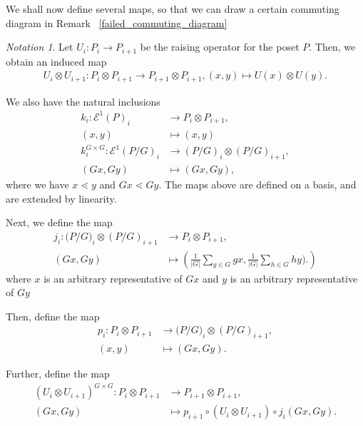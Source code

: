 \documentclass[10 pt]{amsart}
\theoremstyle{plain}
\theoremstyle{definition}
\theoremstyle{remark}
\newtheorem{note}[thm]{Notation}
\numberwithin{equation}{section}
\begin{document}
We shall now define several maps, so that we can draw a certain commuting diagram in Remark ~\ref{failed_commuting_diagram}


\begin{note}
Let $U_i:P_i \rightarrow P_{i+1}$ be the raising operator for the poset $P.$ Then, we obtain an induced map
\begin{align*}
	U_i \otimes U_{i+1}:P_i\otimes P_{i+1} \rightarrow P_{i+1} \otimes P_{i+1},(x,y) \mapsto U(x) \otimes U(y).
\end{align*}

We also have the natural inclusions
\begin{align*}
	k_i:\mathcal E^1(P)_i &\rightarrow P_i \otimes P_{i+1},\\
	(x, y) &\mapsto (x, y)\\
	k_i^{G\times G}:\mathcal E^1(P/G)_i &\rightarrow (P/G)_i \otimes (P/G)_{i+1},\\
	(Gx, Gy) &\mapsto (Gx, Gy),
\end{align*}
where we have $x \lessdot y$ and $Gx \lessdot Gy.$ The maps above are defined on a basis, and are extended by linearity.

Next, we define the map
\begin{align*}
	j_i:\mathcal (P/G)_i \otimes (P/G)_{i+1} & \rightarrow P_i \otimes P_{i+1},\\
	(Gx, Gy) &\mapsto \left(\frac{1}{|G|}\sum_{g \in G}^{} gx, \frac{1}{|G|}\sum_{h\in G}^{}hy).\right)
\end{align*}
where $x$ is an arbitrary representative of $Gx$ and $y$ is an arbitrary representative of $Gy$

Then, define the map
\begin{align*}
	p_i: P_i \otimes P_{i+1} &\rightarrow \mathcal (P/G)_i \otimes (P/G)_{i+1},\\
	(x, y) &\mapsto (Gx, Gy).
\end{align*}

Further, define the map 
\begin{align*}
	(U_i \otimes U_{i+1})^{G\times G}:P_i\otimes P_{i+1} &\rightarrow P_{i+1} \otimes P_{i+1},\\
	(Gx, Gy) &\mapsto p_{i+1}\circ(U_i \otimes U_{i+1})\circ j_i(Gx, Gy).
\end{align*}


\end{note}
\end{document}
